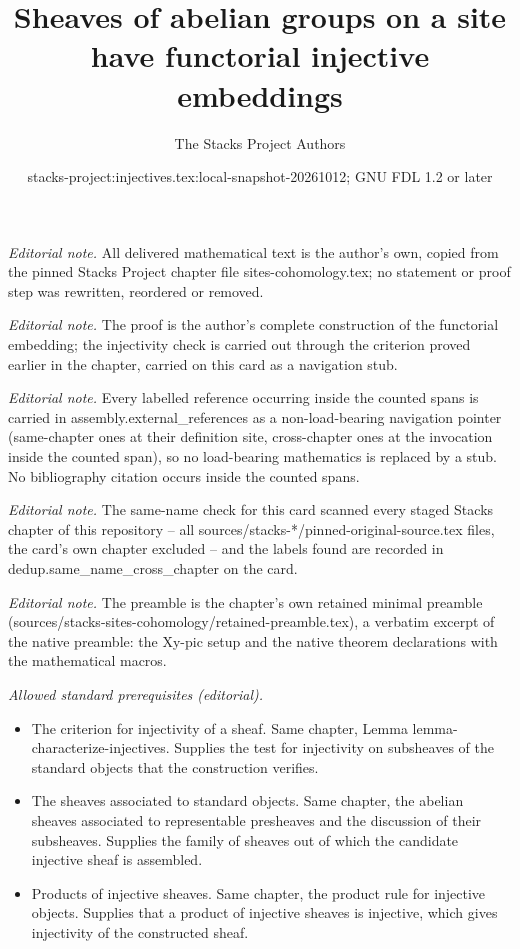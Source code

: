 \documentclass[10pt,a4paper]{amsart}
\title{Sheaves of abelian groups on a site have functorial injective embeddings}
\author{The Stacks Project Authors}
\date{stacks-project:injectives.tex:local-snapshot-20261012; GNU FDL 1.2 or later}
\theoremstyle{plain}
\theoremstyle{definition}
\theoremstyle{remark}
\numberwithin{equation}{subsection}
\begin{document}
\maketitle
\noindent\textit{Editorial note.} All delivered mathematical text is the author's own, copied from the pinned Stacks Project chapter file sites-cohomology.tex; no statement or proof step was rewritten, reordered or removed.\par\medskip
\noindent\textit{Editorial note.} The proof is the author's complete construction of the functorial embedding; the injectivity check is carried out through the criterion proved earlier in the chapter, carried on this card as a navigation stub.\par\medskip
\noindent\textit{Editorial note.} Every labelled reference occurring inside the counted spans is carried in assembly.external\_references as a non-load-bearing navigation pointer (same-chapter ones at their definition site, cross-chapter ones at the invocation inside the counted span), so no load-bearing mathematics is replaced by a stub. No bibliography citation occurs inside the counted spans.\par\medskip
\noindent\textit{Editorial note.} The same-name check for this card scanned every staged Stacks chapter of this repository -- all sources/stacks-*/pinned-original-source.tex files, the card's own chapter excluded -- and the labels found are recorded in dedup.same\_name\_cross\_chapter on the card.\par\medskip
\noindent\textit{Editorial note.} The preamble is the chapter's own retained minimal preamble (sources/stacks-sites-cohomology/retained-preamble.tex), a verbatim excerpt of the native preamble: the Xy-pic setup and the native theorem declarations with the mathematical macros.\par\medskip
\noindent\textit{Allowed standard prerequisites (editorial).}\begin{itemize}
\item The criterion for injectivity of a sheaf. Same chapter, Lemma lemma-characterize-injectives. Supplies the test for injectivity on subsheaves of the standard objects that the construction verifies.
\item The sheaves associated to standard objects. Same chapter, the abelian sheaves associated to representable presheaves and the discussion of their subsheaves. Supplies the family of sheaves out of which the candidate injective sheaf is assembled.
\item Products of injective sheaves. Same chapter, the product rule for injective objects. Supplies that a product of injective sheaves is injective, which gives injectivity of the constructed sheaf.
\end{itemize}\medskip
\end{document}
